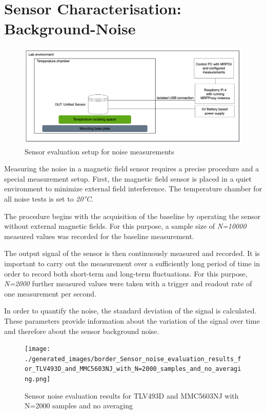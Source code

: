 \hypertarget{sensor-characterisation-background-noise}{%
\section{Sensor Characterisation:
Background-Noise}\label{sensor-characterisation-background-noise}}

\begin{figure}
\centering
\includegraphics{./generated_images/border_Sensor_evaluation_setup_for_noise_measurements.png}
\caption{Sensor evaluation setup for noise measurements
\label{Sensor_evaluation_setup_for_noise_measurements.png}}
\end{figure}

Measuring the noise in a magnetic field sensor requires a precise
procedure and a special measurement setup. First, the magnetic field
sensor is placed in a quiet environment to minimize external field
interference. The temperature chamber for all noise tests is set to
\emph{20°C}.

The procedure begins with the acquisition of the baseline by operating
the sensor without external magnetic fields. For this purpose, a sample
size of \emph{N=10000} measured values was recorded for the baseline
measurement.

The output signal of the sensor is then continuously measured and
recorded. It is important to carry out the measurement over a
sufficiently long period of time in order to record both short-term and
long-term fluctuations. For this purpose, \emph{N=2000} further measured
values were taken with a trigger and readout rate of one measurement per
second.

In order to quantify the noise, the standard deviation of the signal is
calculated. These parameters provide information about the variation of
the signal over time and therefore about the sensor background noise.

\begin{figure}
\centering
\texttt{[image: ./generated\_images/border\_Sensor\_noise\_evaluation\_results\_for\_TLV493D\_and\_MMC5603NJ\_with\_N=2000\_samples\_and\_no\_averaging.png]}
\caption{Sensor noise evaluation results for TLV493D and MMC5603NJ with
N=2000 samples and no averaging
\label{Sensor_noise_evaluation_results_for_TLV493D_and_MMC5603NJ_with_N=2000_samples_and_no_averaging.png}}
\end{figure}

